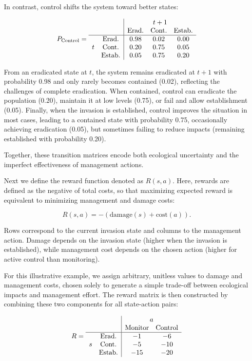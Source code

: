 \documentclass[
  11pt,
  a4paper,
]{article}
\begin{document}
In contrast, control shifts the system toward better states:

\[
P_{\text{Control}} =
\begin{array}{cc|ccc}
& & \multicolumn{3}{c}{t+1} \\
& & \text{Erad.} & \text{Cont.} & \text{Estab.} \\
\hline
\multirow{3}{*}{$t$} 
& \text{Erad.}  & 0.98 & 0.02 & 0.00 \\
& \text{Cont.}  & 0.20 & 0.75 & 0.05 \\
& \text{Estab.} & 0.05 & 0.75 & 0.20 \\
\end{array}
\]

From an eradicated state at \(t\), the system remains eradicated at \(t+1\) with probability 0.98 and only rarely becomes contained (0.02), reflecting the challenges of complete eradication. When contained, control can eradicate the population (0.20), maintain it at low levels (0.75), or fail and allow establishment (0.05). Finally, when the invasion is established, control improves the situation in most cases, leading to a contained state with probability 0.75, occasionally achieving eradication (0.05), but sometimes failing to reduce impacts (remaining established with probability 0.20).

Together, these transition matrices encode both ecological uncertainty and the imperfect effectiveness of management actions.

Next we define the reward function denoted as \(R(s,a)\). Here, rewards are defined as the negative of total costs, so that maximizing expected reward is equivalent to minimizing management and damage costs:

\[
R(s,a) = -(\text{damage}(s) + \text{cost}(a)).
\]

Rows correspond to the current invasion state and columns to the management action. Damage depends on the invasion state (higher when the invasion is established), while management cost depends on the chosen action (higher for active control than monitoring).

For this illustrative example, we assign arbitrary, unitless values to damage and management costs, chosen solely to generate a simple trade-off between ecological impacts and management effort. The reward matrix is then constructed by combining these two components for all state-action pairs:

\[
R =
\begin{array}{cc|cc}
& & \multicolumn{2}{c}{a} \\
& & \text{Monitor} & \text{Control} \\
\hline
\multirow{3}{*}{$s$} 
& \text{Erad.}  & -1  & -6  \\
& \text{Cont.}  & -5  & -10 \\
& \text{Estab.} & -15 & -20 \\
\end{array}
\]
\end{document}
